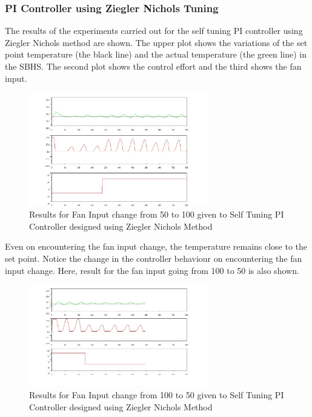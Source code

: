 \newpage
\subsubsection{PI Controller using Ziegler Nichols Tuning}
The results of the experiments carried out for the self tuning PI controller using Ziegler Nichols method are shown. The upper plot shows the variations of the set point temperature (the black line) and the actual temperature (the green line) in the SBHS. The second plot shows the control effort and the third shows the fan input.
\begin{figure}[h]
	\centering
\includegraphics[width=0.7\textwidth]{Vikas_self/report_tex/PID_results/self_tuning/FanDisturbance/PI/step50to100final.jpg}
	
\caption{Results for Fan Input change from 50 to 100 given to Self Tuning PI Controller designed using Ziegler Nichols Method}
\end{figure}

Even on encountering the fan input change, the temperature remains close to the set point. Notice the change in the controller behaviour on encountering the fan input change. 
\newpage
Here, result for the fan input going from 100 to 50 is also shown.
\begin{figure}[h]
	\centering
\includegraphics[width=0.7\textwidth]{Vikas_self/report_tex/PID_results/self_tuning/FanDisturbance/PI/step100to50.jpg}
	
\caption{Results for Fan Input change from 100 to 50 given to Self Tuning PI Controller designed using Ziegler Nichols Method}
\end{figure}


